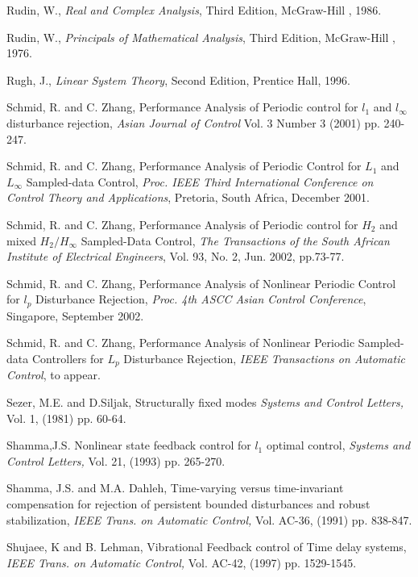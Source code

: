 \begin{thebibliography}{99}
Rudin, W.,  {\em Real and  Complex Analysis}, Third Edition, McGraw-Hill , 1986.


Rudin, W.,  {\em Principals of Mathematical Analysis}, Third Edition, McGraw-Hill ,
1976.

Rugh, J.,  {\em Linear System Theory}, Second Edition, Prentice Hall, 1996.


Schmid, R. and C. Zhang, Performance  Analysis  of  Periodic  control for  $l_1$ and
$l_\infty $ disturbance rejection, {\em Asian Journal of Control } Vol. 3 Number 3
 (2001)
 pp. 240-247.

Schmid, R. and C. Zhang, Performance Analysis of Periodic Control for $L_1$ and
$L_\infty$ Sampled-data  Control, {\it Proc.  IEEE Third International Conference
on  Control  Theory and Applications}, Pretoria, South Africa,  December 2001.

Schmid, R. and C. Zhang, Performance  Analysis  of  Periodic  control for  $H_2$ and
 mixed $H_2 / H_\infty $ Sampled-Data Control,   {\em The Transactions of the South
 African Institute of Electrical Engineers}, Vol. 93, No. 2, Jun. 2002, pp.73-77.

Schmid, R. and C. Zhang, Performance Analysis of Nonlinear Periodic Control for $l_p$
Disturbance Rejection,  {\it Proc.  4th  ASCC Asian Control
Conference}, Singapore, September  2002.


Schmid, R. and C. Zhang, Performance Analysis of Nonlinear Periodic Sampled-data
Controllers  for $L_p$ Disturbance Rejection,  {\it IEEE Transactions on Automatic
Control}, to appear.


Sezer, M.E.   and  D.Siljak, Structurally  fixed   modes {\em Systems and Control
Letters,} Vol. 1, (1981) pp. 60-64.

Shamma,J.S.  Nonlinear  state  feedback  control for $l_1$ optimal  control,
{\em Systems and Control Letters,} Vol. 21, (1993) pp. 265-270.


Shamma, J.S. and M.A. Dahleh, Time-varying versus time-invariant
compensation for rejection of persistent bounded disturbances
and robust stabilization, {\em IEEE Trans. on Automatic
Control,} Vol. AC-36, (1991) pp. 838-847.

Shujaee, K and B. Lehman, Vibrational  Feedback  control of  Time  delay  systems,
{\em IEEE Trans. on Automatic Control,} Vol. AC-42, (1997) pp. 1529-1545.



\end{thebibliography}

